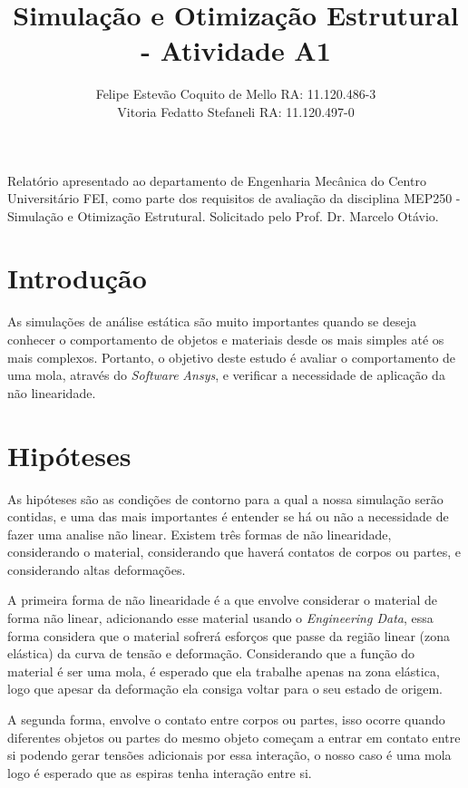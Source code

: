 \documentclass[acronym,symbols]{fei}
\title{Simulação e Otimização Estrutural - Atividade A1 }
\author{Felipe Estevão Coquito de Mello RA: 11.120.486-3\\ Vitoria Fedatto Stefaneli RA: 11.120.497-0}
\begin{document}
\maketitle

\begin{folhaderosto}
 Relatório apresentado ao departamento de Engenharia Mecânica do Centro Universitário FEI, como parte dos requisitos de avaliação da disciplina MEP250 - Simulação e Otimização Estrutural. Solicitado pelo Prof. Dr. Marcelo Otávio.
\end{folhaderosto}

\listoffigures
\tableofcontents

\chapter{Introdução}

As simulações de análise estática são muito importantes quando se deseja conhecer o comportamento de objetos e materiais desde os mais simples até os mais complexos.
Portanto, o objetivo deste estudo é avaliar o comportamento de uma mola, através do \textit{Software} \textit{Ansys}, e verificar a necessidade de aplicação da não linearidade. 



\chapter{Hipóteses}

As hipóteses são as condições de contorno para a qual a nossa simulação serão contidas, e uma das mais importantes é entender se há ou não a necessidade de fazer uma analise não linear. Existem três formas de não linearidade, considerando o material, considerando que haverá contatos de corpos ou partes, e considerando altas deformações.

A primeira forma de não linearidade é a que envolve considerar o material de forma não linear, adicionando esse material usando o \textit{Engineering Data}, essa forma considera que o material sofrerá esforços que passe da região linear (zona elástica) da curva de tensão e deformação. Considerando que a função do material é ser uma mola, é esperado que ela trabalhe apenas na zona elástica, logo que apesar da deformação ela consiga voltar para o seu estado de origem.

A segunda forma, envolve o contato entre corpos ou partes, isso ocorre quando diferentes objetos ou partes do mesmo objeto começam a entrar em contato entre si podendo gerar tensões adicionais por essa interação, o nosso caso é uma mola logo é esperado que as espiras tenha interação entre si.
\end{document}

